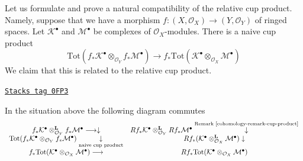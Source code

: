 Let us formulate and prove a natural compatibility of the
relative cup product. Namely, suppose that we have a morphism
$f : (X, \mathcal{O}_X) \to (Y, \mathcal{O}_Y)$ of ringed spaces.
Let $\mathcal{K}^\bullet$ and $\mathcal{M}^\bullet$
be complexes of $\mathcal{O}_X$-modules.
There is a naive cup product
$$
\text{Tot}(
f_*\mathcal{K}^\bullet
\otimes_{\mathcal{O}_Y}
f_*\mathcal{M}^\bullet)
\longrightarrow
f_*\text{Tot}(\mathcal{K}^\bullet
\otimes_{\mathcal{O}_X}
\mathcal{M}^\bullet)
$$
We claim that this is related to the relative cup product.

\begin{lemma}
\label{cohomology-lemma-cup-compatible-with-naive}
\href{https://stacks.math.columbia.edu/tag/0FP3}{\texttt{Stacks tag 0FP3}}

In the situation above the following diagram commutes
$$
\begin{array}{cc}f_*\mathcal{K}^\bullet
\otimes_{\mathcal{O}_Y}^\mathbf{L}
f_*\mathcal{M}^\bullet \longrightarrow\downarrow & Rf_*\mathcal{K}^\bullet
\otimes_{\mathcal{O}_Y}^\mathbf{L}
Rf_*\mathcal{M}^\bullet \overset{\text{Remark \ref{cohomology-remark-cup-product}}}{\downarrow} \\ \text{Tot}(
f_*\mathcal{K}^\bullet
\otimes_{\mathcal{O}_Y}
f_*\mathcal{M}^\bullet) \underset{\text{naive cup product}}{\downarrow} & Rf_*(\mathcal{K}^\bullet
\otimes_{\mathcal{O}_X}^\mathbf{L}
\mathcal{M}^\bullet) \downarrow \\ f_*\text{Tot}(\mathcal{K}^\bullet
\otimes_{\mathcal{O}_X}
\mathcal{M}^\bullet) \longrightarrow & Rf_*\text{Tot}(\mathcal{K}^\bullet
\otimes_{\mathcal{O}_X}
\mathcal{M}^\bullet)\end{array}
$$
\end{lemma}

